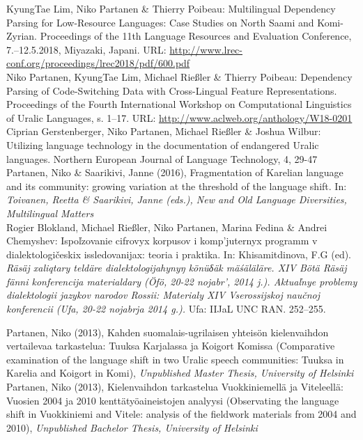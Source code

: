 \documentclass[11pt, a4paper]{article}
\newcommand{\years}[1]{\marginnote{\scriptsize #1}} %
\begin{document}
\years{2018} KyungTae Lim, Niko Partanen \& Thierry Poibeau: Multilingual Dependency Parsing for Low-Resource Languages: Case Studies on North Saami and Komi-Zyrian. Proceedings of the 11th Language Resources and Evaluation Conference, 7.--12.5.2018, Miyazaki, Japani. URL: \url{http://www.lrec-conf.org/proceedings/lrec2018/pdf/600.pdf}\\

\years{2018} Niko Partanen, KyungTae Lim, Michael Rießler \& Thierry Poibeau: Dependency Parsing of Code-Switching Data with Cross-Lingual Feature Representations. Proceedings of the Fourth International Workshop on Computational Linguistics of Uralic Languages, s. 1--17. URL: \url{http://www.aclweb.org/anthology/W18-0201}\\

\years{2016} Ciprian Gerstenberger, Niko Partanen, Michael Rießler \& Joshua Wilbur: Utilizing language technology in the documentation of endangered Uralic languages. Northern European Journal of Language Technology, 4, 29-47 \\

\years{2016} Partanen, Niko \& Saarikivi, Janne (2016), Fragmentation of Karelian language and its community: growing variation at the threshold of the language shift. In: \emph{Toivanen, Reetta \& Saarikivi, Janne (eds.), New and Old Language Diversities, Multilingual Matters}\\

\years{2014} Rogier Blokland, Michael Rießler, Niko Partanen, Marina Fedina \& Andrei Chemyshev: Ispoľzovanie cifrovyx korpusov i komp’juternyx programm v dialektologičeskix issledovanijax: teoria i praktika. In: Khisamitdinova, F.G (ed). \emph{Räsäj xaliqtary teldäre dialektologijahynyŋ könüδäk mäśäläläre. XIV Bötä Räsäj fänni konferencija materialdary (Öfö, 20-22 nojabr’, 2014 j.). Aktuaľnye problemy dialektologii jazykov narodov Rossii: Materialy XIV Vserossijskoj naučnoj konferencii (Ufa, 20-22 nojabrja 2014 g.).} Ufa: IIJaL UNC RAN. 252–255.

\years{2013}Partanen, Niko (2013), Kahden suomalais-ugrilaisen yhteisön kielenvaihdon vertailevaa tarkastelua: Tuuksa Karjalassa ja Koigort Komissa (Comparative examination of the language shift in two Uralic speech communities: Tuuksa in Karelia and Koigort in Komi), \emph{Unpublished Master Thesis, University of Helsinki}\\

\years{2013}Partanen, Niko (2013), Kielenvaihdon tarkastelua Vuokkiniemellä ja Viteleellä: Vuosien 2004 ja 2010 kenttätyöaineistojen analyysi (Observating the language shift in Vuokkiniemi and Vitele: analysis of the fieldwork materials from 2004 and 2010), \emph{Unpublished Bachelor Thesis, University of Helsinki}\\
\end{document}
